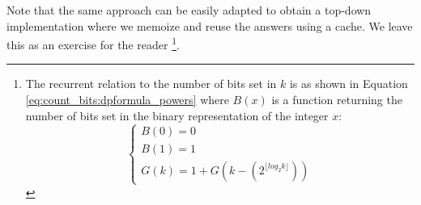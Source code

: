 Note that the same approach can be easily adapted to obtain a top-down implementation where we memoize and reuse the answers using a cache.
We leave this as an exercise for the reader \footnote{The recurrent relation to the number of bits set in $k$ is as shown in Equation \ref{eq:count_bits:dpformula_powers} where $B(x)$ is a function returning the number of bits set in the binary representation of the integer $x$:
\begin{equation}
	\begin{cases}
		B(0) = 0 \\
		B(1) = 1 \\
		G(k) =  1 + G(k-(2^{\lfloor log_2{k \rfloor}})) 	 \end{cases}
	\label{eq:count_bits:dpformula_powers}
\end{equation}
}.